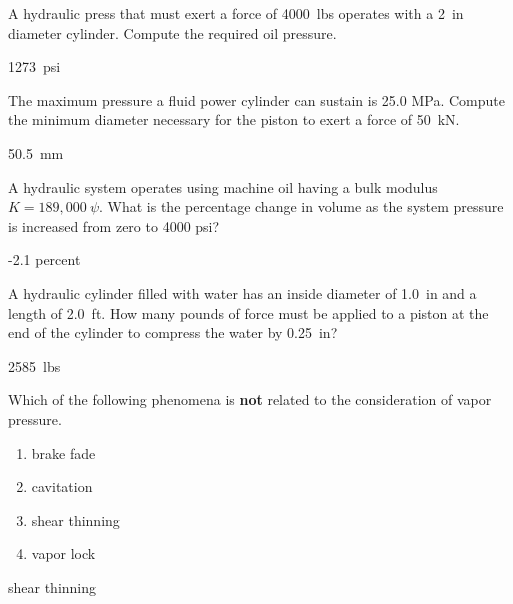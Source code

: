 \documentclass[multi,preview,varwidth=false,border=5,12pt]{standalone}
\begin{document}
\begin{question}
A hydraulic press that must exert a force of 4000~lbs operates with a 2~in diameter cylinder.  Compute the required oil pressure.

\begin{solution}
1273~psi
\end{solution}


\end{question}

\begin{question}
The maximum pressure a fluid power cylinder can sustain is 25.0 MPa.  Compute the minimum diameter necessary for the piston to exert a force of 50~kN.

\begin{solution}
50.5~mm
\end{solution}

\end{question}

\begin{question}
A hydraulic system operates using machine oil having a bulk modulus $K=189,000~\psi$.  What is the percentage change in volume as the system pressure is increased from zero to 4000 psi?

\begin{solution}
-2.1 percent
\end{solution}

\end{question}

\begin{question}
A hydraulic cylinder filled with water has an inside diameter of 1.0~in and a length of 2.0~ft. How many pounds of force must be applied to a piston at the end of the cylinder to compress the water by 0.25~in?

\begin{solution}
2585~lbs
\end{solution}

\end{question}

\begin{question}

Which of the following phenomena is {\bf not} related to the consideration of vapor pressure.

\begin{enumerate}
  \item brake fade
  \item cavitation
  \item shear thinning
  \item vapor lock
\end{enumerate}

\begin{solution}
shear thinning
\end{solution}

\end{question}
\end{document}
